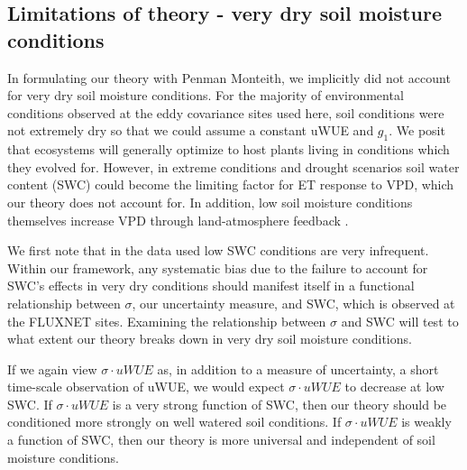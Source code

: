 \documentclass[draft,linenumbers]{agujournal}
\providecommand{\DIFaddbegin}{} %
\providecommand{\DIFaddend}{} %
\begin{document}
\subsection{Limitations of theory - very dry soil moisture conditions}
\DIFaddbegin \label{swc_section}
\DIFaddend In formulating our theory with Penman Monteith, we implicitly did not
account for very dry soil moisture conditions. For the majority of
environmental conditions observed at the eddy covariance sites used
here, soil conditions were not extremely dry so that we could assume a
constant uWUE and $g_1$. We posit that ecosystems will generally
optimize to host plants living in conditions which they evolved
for. However, in extreme conditions and drought scenarios soil water
content (SWC) could become the limiting factor for ET response to VPD,
which our theory does not account for. In addition, low soil moisture
conditions themselves increase VPD through land-atmosphere feedback
\citep[][]{Bouchet_1963, Morton_1965, Brutsaert_1999, Ozdogan_2006,
  Salvucci_2013, Gentine_2016, Berg_2016}.

We first note that in the data used low SWC conditions are very
infrequent. Within our framework, any systematic bias due to the
failure to account for SWC's effects in very dry conditions should
manifest itself in a functional relationship between $\sigma$, our
uncertainty measure, and SWC, which is observed at the FLUXNET
sites. Examining the relationship between $\sigma$ and SWC will test
to what extent our theory breaks down in very dry soil moisture
conditions.

If we again view $\sigma \cdot uWUE$ as, in addition to a measure of
uncertainty, a short time-scale observation of uWUE, we would expect
$\sigma \cdot uWUE$ to decrease at low SWC. If $\sigma \cdot uWUE$ is
a very strong function of SWC, then our theory should be conditioned
more strongly on well watered soil conditions. If $\sigma \cdot uWUE$
is weakly a function of SWC, then our theory is more universal and
independent of soil moisture conditions.
\end{document}
